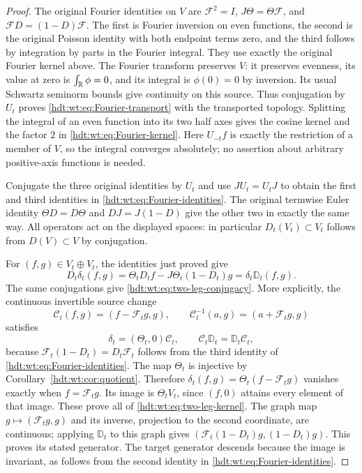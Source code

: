 \begin{proof}
The original Fourier identities on $V$ are
$\mathcal F^2=I$, $J\Theta=\Theta\mathcal F$, and
$\mathcal FD=(1-D)\mathcal F$.  The first is Fourier inversion
on even functions, the second is the original Poisson identity
with both endpoint terms zero, and the third follows by integration
by parts in the Fourier integral.  They use exactly the original
Fourier kernel above.  The Fourier transform preserves $V$:
it preserves evenness, its value at zero is $\int_\mathbb R\phi=0$,
and its integral is $\phi(0)=0$ by inversion.  Its usual Schwartz
seminorm bounds give continuity on this source.  Thus conjugation
by $U_t$ proves \eqref{hdt:wt:eq:Fourier-transport} with the
transported topology.  Splitting the integral of an even function
into its two half axes gives the cosine kernel and the factor
$2$ in \eqref{hdt:wt:eq:Fourier-kernel}.  Here $U_{-t}f$ is exactly
the restriction of a member of $V$, so the integral converges
absolutely; no assertion about arbitrary positive-axis functions
is needed.

Conjugate the three original identities by $U_t$ and use
$JU_t=U_tJ$ to obtain the first and third identities in
\eqref{hdt:wt:eq:Fourier-identities}.  The original termwise
Euler identity $\Theta D=D\Theta$ and $DJ=J(1-D)$ give the
other two in exactly the same way.  All operators act on the
displayed spaces: in particular $D_t(V_t)\subset V_t$ follows
from $D(V)\subset V$ by conjugation.

For $(f,g)\in V_t\oplus V_t$, the identities just proved give
\[
 D_t\delta_t(f,g)
 =\Theta_tD_tf-J\Theta_t(1-D_t)g
 =\delta_t\mathbb D_t(f,g).
\]
The same conjugations give \eqref{hdt:wt:eq:two-leg-conjugacy}.
More explicitly, the continuous invertible source change
\[
 \mathcal C_t(f,g)=(f-\mathcal F_tg,g),\qquad
 \mathcal C_t^{-1}(a,g)=(a+\mathcal F_tg,g)
\]
satisfies
\[
 \delta_t=(\Theta_t,0)\mathcal C_t,\qquad
 \mathcal C_t\mathbb D_t=\mathbb D_t\mathcal C_t,
\]
because $\mathcal F_t(1-D_t)=D_t\mathcal F_t$ follows from
the third identity of \eqref{hdt:wt:eq:Fourier-identities}.
The map $\Theta_t$ is injective by
Corollary~\ref{hdt:wt:cor:quotient}.  Therefore
$\delta_t(f,g)=\Theta_t(f-\mathcal F_tg)$ vanishes exactly
when $f=\mathcal F_tg$.  Its image is $\Theta_tV_t$, since
$(f,0)$ attains every element of that image.  These prove all
of \eqref{hdt:wt:eq:two-leg-kernel}.  The graph map
$g\mapsto(\mathcal F_tg,g)$ and its inverse, projection to the
second coordinate, are continuous; applying $\mathbb D_t$
to this graph gives
$(\mathcal F_t(1-D_t)g,(1-D_t)g)$.  This proves its stated
generator.  The target generator descends because the image
is invariant, as follows from the second identity in
\eqref{hdt:wt:eq:Fourier-identities}.
\end{proof}

